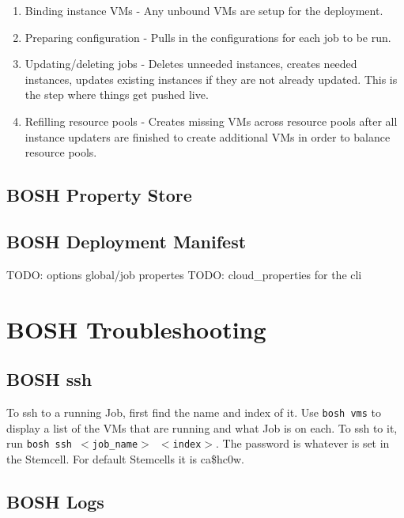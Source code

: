 \begin{enumerate}
\item Binding instance VMs - Any unbound VMs are setup for the deployment.

\item Preparing configuration - Pulls in the configurations for each job to be run.

\item Updating\slash deleting jobs - Deletes unneeded instances, creates needed instances, updates existing instances if they are not already updated. This is the step where things get pushed live.

\item Refilling resource pools - Creates missing VMs across resource pools after all instance updaters are finished to create additional VMs in order to balance resource pools.

\end{enumerate}

\section{BOSH Property Store}
\label{boshpropertystore}

\section{BOSH Deployment Manifest}
\label{boshdeploymentmanifest}

TODO: options global\slash job propertes
TODO: cloud\_properties for the cli

\chapter{BOSH Troubleshooting}
\label{boshtroubleshooting}

\section{BOSH ssh}
\label{boshssh}

To ssh to a running Job, first find the name and index of it. Use \texttt{bosh vms} to display a list of the VMs that are running and what Job is on each. To ssh to it, run \texttt{bosh ssh $<$job\_name$>$ $<$index$>$}. The password is whatever is set in the Stemcell. For default Stemcells it is ca\$hc0w.

\section{BOSH Logs}
\label{boshlogs}

